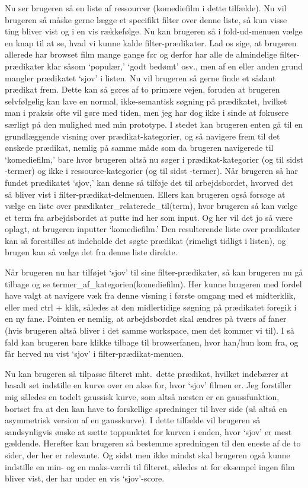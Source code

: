 \documentclass{report}
\begin{document}
Nu ser brugeren så en liste af ressourcer (komediefilm i dette tilfælde). Nu vil brugeren så måske gerne lægge et specifikt filter over denne liste, så kun visse ting bliver vist og i en vis rækkefølge. Nu kan brugeren så i fold-ud-menuen vælge en knap til at se, hvad vi kunne kalde filter-prædikater. Lad os sige, at brugeren allerede har browset film mange gange før og derfor har alle de almindelige filter-prædikater klar såsom `populær,' `godt bedømt' osv., men af en eller anden grund mangler prædikatet `sjov' i listen. Nu vil brugeren så gerne finde et sådant prædikat frem. Dette kan så gøres af to primære vejen, foruden at brugeren selvfølgelig kan lave en normal, ikke-semantisk søgning på prædikatet, hvilket man i praksis ofte vil gøre med tiden, men jeg har dog ikke i sinde at fokusere særligt på den mulighed med min prototype. I stedet kan brugeren enten gå til en grundlæggende visning over prædikat-kategorier, og så navigere frem til det ønskede prædikat, nemlig på samme måde som da brugeren navigerede til `komediefilm,' bare hvor brugeren altså nu søger i prædikat-kategorier (og til sidst -termer) og ikke i ressource-kategorier (og til sidst -termer). Når brugeren så har fundet prædikatet `sjov,' kan denne så tilføje det til arbejdsbordet, hvorved det så bliver vist i filter-prædikat-delmenuen. Ellers kan brugeren også forsøge at vælge en liste over prædikater\_relaterede\_til(term), hvor brugeren så kan vælge et term fra arbejdsbordet at putte ind her som input. Og her vil det jo så være oplagt, at brugeren inputter `komediefilm.' Den resulterende liste over prædikater kan så forestilles at indeholde det søgte prædikat (rimeligt tidligt i listen), og brugen kan så vælge det fra denne liste direkte. 

Når brugeren nu har tilføjet `sjov' til sine filter-prædikater, så kan brugeren nu gå tilbage og se termer\_af\_kategorien(komediefilm). Her kunne brugeren med fordel have valgt at navigere væk fra denne visning i første omgang med et midterklik, eller med ctrl + klik, således at den midlertidige søgning på prædikatet foregik i en ny fane. Pointen er nemlig, at arbejdsbordet skal ændres på tværs af faner (hvis brugeren altså bliver i det samme workspace, men det kommer vi til). I så fald kan brugeren bare klikke tilbage til browserfanen, hvor han/hun kom fra, og får herved nu vist `sjov' i filter-prædikat-menuen. 

Nu kan brugeren så tilpasse filteret mht.\ dette prædikat, hvilket indebærer at basalt set indstille en kurve over en akse for, hvor `sjov' filmen er. Jeg forstiller mig således en todelt gaussisk kurve, som altså næsten er en gaussfunktion, bortset fra at den kan have to forskellige spredninger til hver side (så altså en asymmetrisk version af en gausskurve). I dette tilfælde vil brugeren så sandsynligvis ønske at sætte toppunktet for kurven i enden, hvor `sjov' er mest gældende. Herefter kan brugeren så bestemme spredningen til den eneste af de to sider, der her er relevante. Og sidst men ikke mindst skal brugeren også kunne indstille en min- og en maks-værdi til filteret, således at for eksempel ingen film bliver vist, der har under en vis `sjov'-score. 
\end{document}
